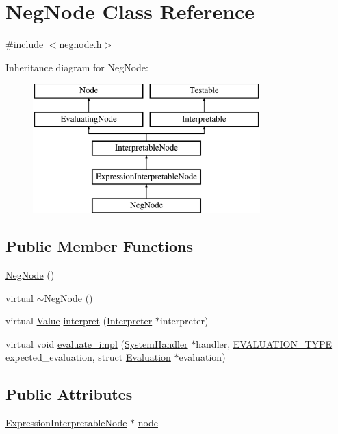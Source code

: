 \hypertarget{classNegNode}{}\section{Neg\+Node Class Reference}
\label{classNegNode}


{\ttfamily \#include $<$negnode.\+h$>$}

Inheritance diagram for Neg\+Node\+:\begin{figure}[H]
\begin{center}
\leavevmode
\includegraphics[height=5.000000cm]{classNegNode}
\end{center}
\end{figure}
\subsection*{Public Member Functions}
\begin{DoxyCompactItemize}
\item 
\hyperlink{classNegNode_a543d2b5abde85cbcaca1e8927ec55c9e}{Neg\+Node} ()
\item 
virtual \hyperlink{classNegNode_aba880abbb0e47060985c5ec3e3e0c3fc}{$\sim$\+Neg\+Node} ()
\item 
virtual \hyperlink{classValue}{Value} \hyperlink{classNegNode_a35ff48d55ab355e27f33dcc21483e4c7}{interpret} (\hyperlink{classInterpreter}{Interpreter} $\ast$interpreter)
\item 
virtual void \hyperlink{classNegNode_a504b9103413ac571d7a332cd4dd0b9c5}{evaluate\+\_\+impl} (\hyperlink{classSystemHandler}{System\+Handler} $\ast$handler, \hyperlink{statics_8h_a6664c451ca7787483a7981cc1de68dbb}{E\+V\+A\+L\+U\+A\+T\+I\+O\+N\+\_\+\+T\+Y\+PE} expected\+\_\+evaluation, struct \hyperlink{structEvaluation}{Evaluation} $\ast$evaluation)
\end{DoxyCompactItemize}
\subsection*{Public Attributes}
\begin{DoxyCompactItemize}
\item 
\hyperlink{classExpressionInterpretableNode}{Expression\+Interpretable\+Node} $\ast$ \hyperlink{classNegNode_ac1c92a11fc98afbb953cd391d84074c2}{node}
\end{DoxyCompactItemize}
